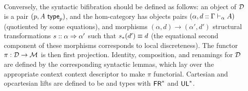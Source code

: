 Conversely, the syntactic bifibration should be defined as
follows: an object of $\mathcal{D}$ is a pair $(p,A \,\, \mathsf{type}_{p})$, and the
hom-category has objects pairs $(\alpha,d :: \Gamma \vdash_{\alpha} A)$
(quotiented by some equations), and morphisms $(\alpha,d) \to (\alpha',d')$
structural transformations $s :: \alpha \Rightarrow \alpha'$ such that
$s_*(d') \equiv d$ (the equational second
component of these morphisms corresponds to local discreteness).  The
functor $\pi : \mathcal{D} \to \mathcal{M}$ is then first projection.  Identity,
composition, and renamings for $\mathcal{D}$ are defined by the corresponding
syntactic lemmas, which lay over the appropriate context context
descriptor to make $\pi$ functorial.  Cartesian and opcartesian lifts
are defined to be \Fsymb{} and \Usymb{} types with $\mathsf{FR}^*$ and $\mathsf{UL}^*$.


